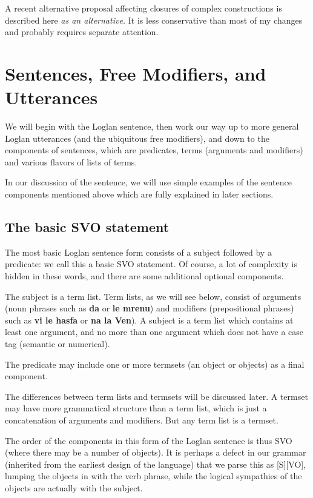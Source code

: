\documentclass[12pt]{book}
\begin{document}
{A recent alternative proposal affecting closures of complex constructions is described here {\em as an alternative.}  It is less conservative than most of my changes and probably requires separate attention.

\section{Sentences, Free Modifiers, and Utterances}

We will begin with the Loglan sentence, then work our way up to more general Loglan utterances (and the ubiquitous free modifiers), and down to the components of sentences, which are predicates, terms (arguments and modifiers) and various flavors of lists of terms.

In our discussion of the sentence, we will use simple examples of the sentence components mentioned above which are fully explained in later sections.

\subsection{The basic SVO statement}

The most basic Loglan sentence form consists of a subject followed by a predicate:  we call this a basic SVO statement.  Of course, a lot of complexity is hidden in these words,
and there are some additional optional components.

The subject is a term list.  Term lists, as we will see below, consist of arguments (noun phrases such as {\bf da} or {\bf le mrenu}) and modifiers (prepositional phrases) such as {\bf vi le hasfa} or {\bf na la Ven}).  A subject is a term list which contains at least one argument, and no more than one argument which does not have a case tag (semantic or numerical).  

The predicate may include one or more termsets (an object or objects) as a final component.

The differences between term lists and termsets will be discussed later.  A termset may have more grammatical structure than a term list, which
is just a concatenation of arguments and modifiers.  But any term list is a termset.

The order of the components in this form of the Loglan sentence is thus SVO (where there may be a number of objects).  It is perhaps a defect in our grammar
(inherited from the earliest design of the language) that we parse this as [S][VO], lumping the objects in with the verb phrase, while the logical sympathies of the objects are actually with the subject.

}
\end{document}
